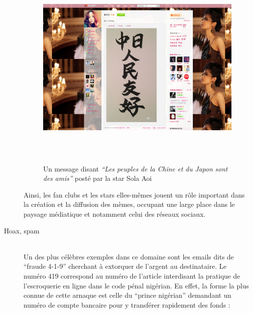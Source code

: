 \begin{description}
\begin{figure}
    \includegraphics[width=6.0114in,height=4.0114in]{figures/chap2/chapitre2-img22.jpg}
    \caption[La star du X japonaise Sola Aoi sur Sina Weibo]{Un message disant\textit{ {\textquotedblleft}Les peuples de la Chine et du Japon sont des amis{\textquotedblright} }post\'e par la star Sola Aoi}
    \label{fig:pornstar-weibo}
\end{figure}

Ainsi, les fan clubs et les stars elles-m\^emes jouent un r\^ole important dans la cr\'eation et la diffusion des m\`emes, occupant une large place dans le paysage m\'ediatique et notamment celui des r\'eseaux sociaux. 


\item[Hoax, spam]
\hfill \\
Un des plus c\'el\`ebres exemples dans ce domaine sont les emails dits
de {\textquotedblleft}fraude 4-1-9{\textquotedblright} cherchant \`a
extorquer de l{\textquoteright}argent au destinataire. Le num\'ero 419
correspond au num\'ero de l{\textquoteright}article interdisant la
pratique de l{\textquoteright}escroquerie en ligne dans le code p\'enal
nig\'erian. En effet, la forme la plus connue de cette arnaque est
celle du {\textquotedblleft}prince nig\'erian{\textquotedblright}
demandant un num\'ero de compte bancaire pour y transf\'erer rapidement
des fonds : 


\end{description}
